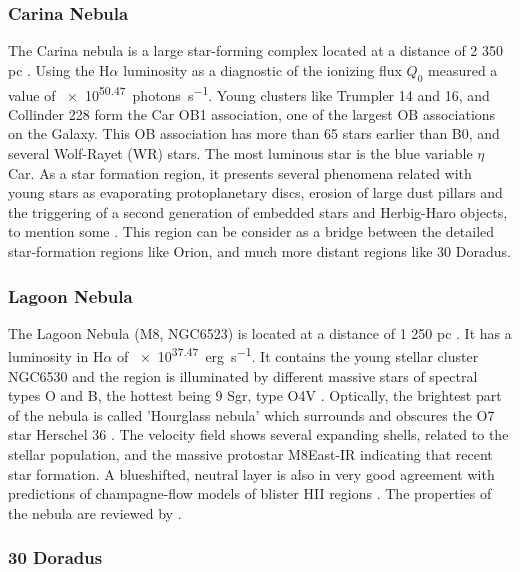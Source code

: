 \documentclass[fleqn,usenatbib, useAMS, a4paper]{mnras}
\newcommand\ha{\ensuremath{\text{H}\alpha}}
\begin{document}
\subsubsection{Carina Nebula}
\label{sec:carina-nebula}

The Carina nebula is a large star-forming complex located at a distance of 2 350 pc \citep{2006ApJ...644.1151S}.
Using the \ha{} luminosity as a diagnostic of the ionizing flux \(Q_0\) \citet{2007MNRAS.379.1279S} measured a value of \SI{e50.47}{photons.s^{-1}}.
Young clusters like Trumpler 14 and 16, and Collinder 228 form the Car OB1 association, one of the largest OB associations on the Galaxy.
This OB association has more than 65 stars earlier than B0, and several Wolf-Rayet (WR) stars.
The most luminous star is the blue variable $\eta$ Car.
As a star formation region, it presents several phenomena related with young stars as evaporating protoplanetary discs, erosion of large dust pillars and the triggering of a second generation of embedded stars and Herbig-Haro objects, to mention some \citetext{see \citealp{2008hsf2.book..138S} and reference therein}. 
This region can be consider as a bridge between the detailed star-formation regions like Orion, and much more distant regions like 30 Doradus.
 
\subsubsection{Lagoon Nebula}
\label{sec:lagoon-nebula}

The Lagoon Nebula (M8, NGC6523) is located at a distance of 1 250 pc \citep{2005A&A...430..941P}.
It has a luminosity in \ha{} of \SI{e37.47}{erg.s^{-1}}\citep{1984ApJ...287..116K}.
It contains the young stellar cluster NGC6530 and the region is illuminated by different massive stars of spectral types O and B, the hottest being 9 Sgr, type O4V \citep{Damiani:2017b}.
Optically, the brightest part of the nebula is called 'Hourglass nebula' which surrounds and obscures the O7 star Herschel 36 \citep{1986AJ.....91..870W}. 
The velocity field shows several expanding shells, related to the stellar population, and the massive protostar M8East-IR \citep{1984ApJ...278..170S} indicating that recent star formation. 
A blueshifted, neutral layer is also in very good agreement with predictions of champagne-flow models of blister HII regions \citep{Damiani:2017b}. 
The properties of the nebula are reviewed by \citet{2008hsf2.book..533T}.

\subsubsection{30 Doradus}
\label{sec:30-doradus}
\end{document}
